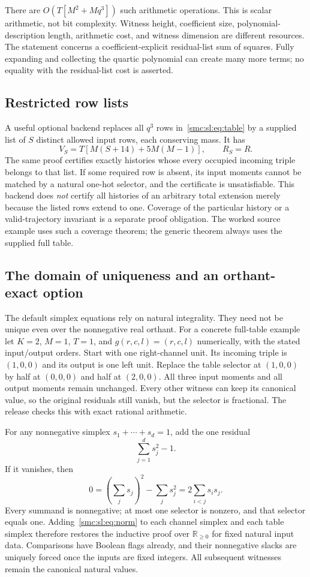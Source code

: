 \documentclass[11pt,letterpaper]{article}
\numberwithin{equation}{section}
\theoremstyle{definition}
\theoremstyle{remark}
\newcommand{\R}{\mathbb R}
\begin{document}
There are $O(T[M^2+Mq^3])$ such arithmetic operations. This is scalar arithmetic, not bit complexity. Witness height, coefficient size, polynomial-description length, arithmetic cost, and witness dimension are different resources. The statement concerns a coefficient-explicit residual-list sum of squares. Fully expanding and collecting the quartic polynomial can create many more terms; no equality with the residual-list cost is asserted.

\subsection{Restricted row lists}
A useful optional backend replaces all $q^3$ rows in~\eqref{smc:sl:eq:table} by a supplied list of $S$ distinct allowed input rows, each conserving mass. It has
\[
 V_S=T[M(S+14)+5M(M-1)],\qquad R_S=R.
\]
The same proof certifies exactly histories whose every occupied incoming triple belongs to that list. If some required row is absent, its input moments cannot be matched by a natural one-hot selector, and the certificate is unsatisfiable. This backend does \emph{not} certify all histories of an arbitrary total extension merely because the listed rows extend to one. Coverage of the particular history or a valid-trajectory invariant is a separate proof obligation. The worked source example uses such a coverage theorem; the generic theorem always uses the supplied full table.

\subsection{The domain of uniqueness and an orthant-exact option}\label{smc:sl:sec:orthant}
The default simplex equations rely on natural integrality. They need not be unique even over the nonnegative real orthant. For a concrete full-table example let $K=2$, $M=1$, $T=1$, and $g(r,c,l)=(r,c,l)$ numerically, with the stated input/output orders. Start with one right-channel unit. Its incoming triple is $(1,0,0)$ and its output is one left unit. Replace the table selector at $(1,0,0)$ by half at $(0,0,0)$ and half at $(2,0,0)$. All three input moments and all output moments remain unchanged. Every other witness can keep its canonical value, so the original residuals still vanish, but the selector is fractional. The release checks this with exact rational arithmetic.

For any nonnegative simplex $s_1+\cdots+s_d=1$, add the one residual
\begin{equation}\label{smc:sl:eq:norm}
 \sum_{j=1}^d s_j^2-1.
\end{equation}
If it vanishes, then
\[
 0=(\sum_js_j)^2-\sum_js_j^2=2\sum_{i<j}s_is_j.
\]
Every summand is nonnegative; at most one selector is nonzero, and that selector equals one. Adding~\eqref{smc:sl:eq:norm} to each channel simplex and each table simplex therefore restores the inductive proof over $\R_{\ge0}$ for fixed natural input data. Comparisons have Boolean flags already, and their nonnegative slacks are uniquely forced once the inputs are fixed integers. All subsequent witnesses remain the canonical natural values.
\end{document}

